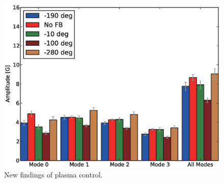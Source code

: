 \begin{figure}[t]
 \centering
 \includegraphics[width=0.9\hsize]{eps/overview.eps}
 \caption{New findings of plasma control.}
 \label{fig:plasma_overview}
\end{figure}
